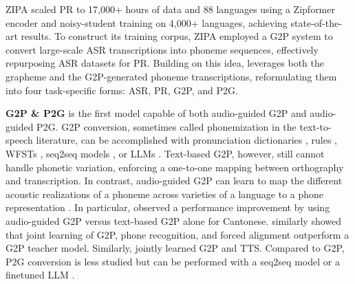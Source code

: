 ZIPA \citep{zhu-etal-2025-zipa} scaled PR to 17,000+ hours of data and 88 languages using a Zipformer \cite{yao2023zipformer} encoder and noisy-student training on 4,000+ languages, achieving state-of-the-art results. To construct its training corpus, ZIPA employed a G2P system to convert large-scale ASR transcriptions into phoneme sequences, effectively repurposing ASR datasets for PR. Building on this idea, \POWSM leverages both the grapheme and the G2P-generated phoneme transcriptions, reformulating them into four task-specific forms: ASR, PR, G2P, and P2G.

\textbf{G2P \& P2G} \POWSM is the first model capable of both audio-guided G2P and audio-guided P2G. 
G2P conversion, sometimes called phonemization in the text-to-speech literature, can be accomplished with pronunciation dictionaries \citep{rudnicky2003cmu}, rules \citep{mortensen2018epitran}, WFSTs \citep{black2001flite}, seq2seq models \citep{zhu2022charsiu-g2p}, or LLMs \citep{qharabagh2025llm}. %
Text-based G2P, however, still cannot handle phonetic variation, enforcing a one-to-one mapping between orthography and transcription.
In contrast, audio-guided G2P can learn to map the different acoustic realizations of a phoneme across varieties of a language to a phone representation \cite{route-etal-2019-multimodal}.
In particular, \citet{mak2025speech} observed a performance improvement by using audio-guided G2P versus text-based G2P alone for Cantonese.
\citet{gao2024g2pu} similarly showed that joint learning of G2P, phone recognition, and forced alignment outperform a G2P teacher model. Similarly, \citet{sun2024acquiring} jointly learned G2P and TTS.
Compared to G2P, P2G conversion is less studied but can be performed with a seq2seq model \citep{lauc2024polyipa} or a finetuned LLM \citep{ma2025llm}.  %







